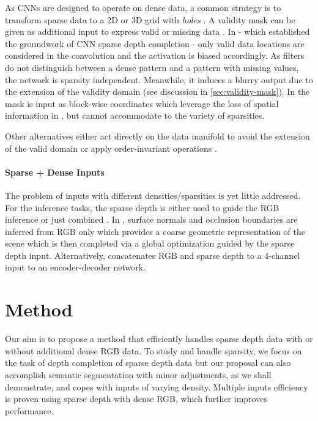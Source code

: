 \documentclass[10pt,twocolumn,letterpaper]{article}
\begin{document}
As CNNs are designed to operate on dense data, a common strategy is to transform sparse data to a 2D or 3D grid with \textit{holes} \cite{uhrig2017sparsity,ren2018SBNet,riegler2017octnet}.
A validity mask can be given as additional input to express valid or missing data \cite{uhrig2017sparsity,ren2018SBNet}. In \cite{uhrig2017sparsity} - which established the groundwork of CNN sparse depth completion - only valid data locations are considered in the convolution and the activation is biased accordingly. As filters do not distinguish between a dense pattern and a pattern with missing values, the network is sparsity independent. Meanwhile, it induces a blurry output due to the extension of the validity domain (see discussion in \ref{sec:validity-mask}). In \cite{ren2018SBNet} the mask is input as block-wise coordinates which leverage the loss of spatial information in \cite{uhrig2017sparsity}, but cannot accommodate to the variety of sparsities.

Other alternatives either act directly on the data manifold \cite{graham2017submanifold} to avoid the extension of the valid domain or apply order-invariant operations \cite{qi2017pointnet}.


\paragraph{Sparse + Dense Inputs}
The problem of inputs with different densities/sparsities is yet little addressed.
For the inference tasks, the sparse depth is either used to guide the RGB inference \cite{zhang2018deep} or just combined \cite{ma2018sparse}.
In \cite{zhang2018deep}, surface normals and occlusion boundaries are inferred from RGB only which provides a coarse geometric representation of the scene which is then completed via a global optimization guided by the sparse depth input. 
Alternatively, \cite{ma2018sparse} concatenates RGB and sparse depth to a 4-channel input to an encoder-decoder network.


\section{Method}
\label{sec:method}

Our aim is to propose a method that efficiently handles sparse depth data with or without additional dense RGB data. To study and handle sparsity, we focus on the task of depth completion of sparse depth data but our proposal can also accomplish semantic segmentation with minor adjustments, as we shall demonstrate, and copes with inputs of varying density. Multiple inputs efficiency is proven using sparse depth with dense RGB, which further improves performance.
\end{document}
